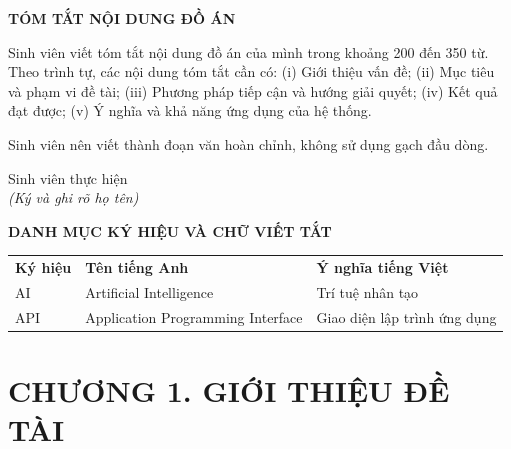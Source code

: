 \documentclass[a4paper,12pt]{report}
\begin{document}
\cleardoublepage
\thispagestyle{empty}

\begin{center}
    {\bfseries\fontsize{18pt}{20pt}\selectfont TÓM TẮT NỘI DUNG ĐỒ ÁN}
\end{center}

\vspace{1.5cm}

Sinh viên viết tóm tắt nội dung đồ án của mình trong khoảng 200 đến 350 từ. 
Theo trình tự, các nội dung tóm tắt cần có:
(i) Giới thiệu vấn đề;
(ii) Mục tiêu và phạm vi đề tài;
(iii) Phương pháp tiếp cận và hướng giải quyết;
(iv) Kết quả đạt được;
(v) Ý nghĩa và khả năng ứng dụng của hệ thống.

Sinh viên nên viết thành đoạn văn hoàn chỉnh, không sử dụng gạch đầu dòng.

\vspace{2cm}

\begin{flushright}
Sinh viên thực hiện\\
{\itshape (Ký và ghi rõ họ tên)}
\end{flushright}

\cleardoublepage
\tableofcontents

\cleardoublepage

\begin{center}
    {\bfseries\fontsize{18pt}{20pt}\selectfont
    DANH MỤC KÝ HIỆU VÀ CHỮ VIẾT TẮT}
\end{center}

\vspace{1cm}

\begin{longtable}{p{3cm} p{5cm} p{6cm}}
\textbf{Ký hiệu} & \textbf{Tên tiếng Anh} & \textbf{Ý nghĩa tiếng Việt} \\

AI & Artificial Intelligence & Trí tuệ nhân tạo \\

API & Application Programming Interface & Giao diện lập trình ứng dụng \\

\end{longtable}

\cleardoublepage

\chapter*{CHƯƠNG 1. GIỚI THIỆU ĐỀ TÀI}
\end{document}
